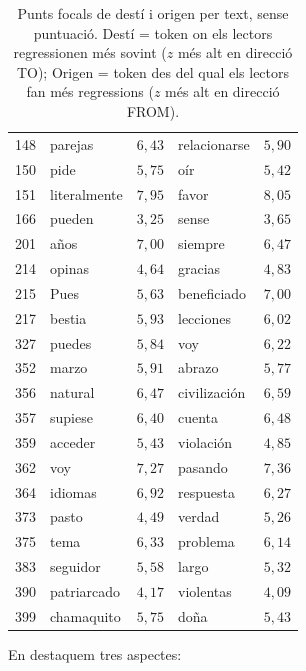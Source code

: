 \begin{table}[htbp]
\begin{tabular}{clclc}
148 & parejas & $6,43$ & relacionarse & $5,90$ \\
150 & pide & $5,75$ & oír & $5,42$ \\
151 & literalmente & $7,95$ & favor & $8,05$ \\
166 & pueden & $3,25$ & sense & $3,65$ \\
201 & años & $7,00$ & siempre & $6,47$ \\
214 & opinas & $4,64$ & gracias & $4,83$ \\
215 & Pues & $5,63$ & beneficiado & $7,00$ \\
217 & bestia & $5,93$ & lecciones & $6,02$ \\
327 & puedes & $5,84$ & voy & $6,22$ \\
352 & marzo & $5,91$ & abrazo & $5,77$ \\
356 & natural & $6,47$ & civilización & $6,59$ \\
357 & supiese & $6,40$ & cuenta & $6,48$ \\
359 & acceder & $5,43$ & violación & $4,85$ \\
362 & voy & $7,27$ & pasando & $7,36$ \\
364 & idiomas & $6,92$ & respuesta & $6,27$ \\
373 & pasto & $4,49$ & verdad & $5,26$ \\
375 & tema & $6,33$ & problema & $6,14$ \\
383 & seguidor & $5,58$ & largo & $5,32$ \\
390 & patriarcado & $4,17$ & violentas & $4,09$ \\
399 & chamaquito & $5,75$ & doña & $5,43$ \\
\bottomrule
\end{tabular}
\caption{Punts focals de destí i origen per text, sense puntuació. Destí = token on els lectors regressionen més sovint ($z$ més alt en direcció TO); Origen = token des del qual els lectors fan més regressions ($z$ més alt en direcció FROM).}
\label{tab:top_hotspots}
\end{table}
\fi
En destaquem tres aspectes:
